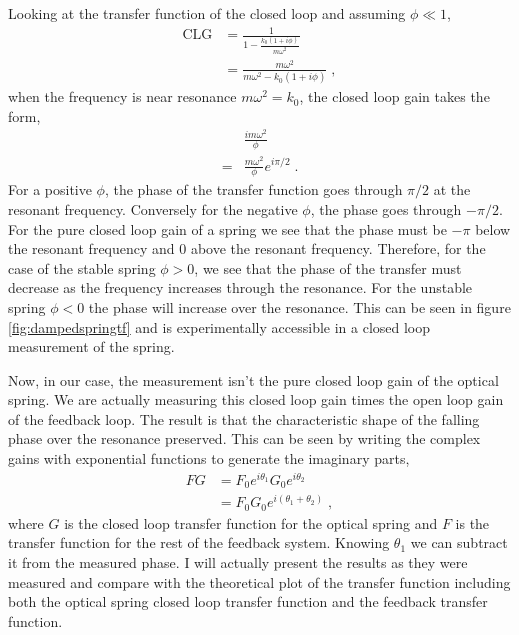 
Looking at the transfer function of the closed loop and assuming $\phi \ll 1$,
\begin{align}
\mathrm{CLG} &= \frac{1}{1-\frac{k_0(1+i\phi)}{m\omega^2}} \nonumber \\
  &= \frac{m\omega^2}{m\omega^2-k_0(1+i\phi)} \;,
\end{align}
when the frequency is near resonance $m\omega^2 = k_0$,
the closed loop gain takes the form,
\begin{align}
&\frac{im\omega^2}{\phi} \nonumber \\
=&\frac{m\omega^2}{\phi}e^{i\pi/2} \;.
\end{align}
For a positive $\phi$, the phase of the transfer function goes through $\pi/2$
at the resonant frequency.
Conversely for the negative $\phi$, the phase goes through $-\pi/2$.
For the pure closed loop gain of a spring we see that the phase must be $-\pi$
below the resonant frequency and $0$ above the resonant frequency.
Therefore, for the case of the stable spring $\phi>0$, we see that the phase of
the transfer must decrease as the frequency increases through the resonance.
For the unstable spring $\phi<0$ the phase will increase over the resonance.
This can be seen in figure \ref{fig:dampedspringtf} and is experimentally
accessible in a closed loop measurement of the spring.

Now, in our case, the measurement isn't the pure closed loop gain of the
optical spring.
We are actually measuring this closed loop gain times the open loop gain of the
feedback loop.
The result is that the characteristic shape of the falling phase over the
resonance preserved.
This can be seen by writing the complex gains with exponential functions to
generate the imaginary parts,
\begin{align}
FG &= F_0e^{i\theta_1}G_0e^{i\theta_2} \nonumber \\
  &= F_0G_0e^{i(\theta_1+\theta_2)} \;,
\end{align}
where $G$ is the closed loop transfer function for the optical spring and
$F$ is the transfer function for the rest of the feedback system.
Knowing $\theta_1$ we can subtract it from the measured phase.
I will actually present the results as they were measured and compare with the
theoretical plot of the transfer function including both the optical spring
closed loop transfer function and the feedback transfer function.

